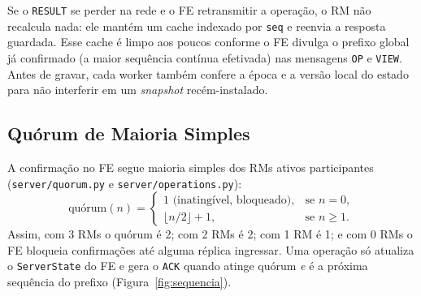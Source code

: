 \documentclass[12pt]{article}
\begin{document}
Se o \texttt{RESULT} se perder na rede e o FE retransmitir a operação, o RM não recalcula nada: ele mantém um cache indexado por \texttt{seq} e reenvia a resposta guardada. Esse cache é limpo aos poucos conforme o FE divulga o prefixo global já confirmado (a maior sequência contínua efetivada) nas mensagens \texttt{OP} e \texttt{VIEW}. Antes de gravar, cada worker também confere a época e a versão local do estado para não interferir em um \textit{snapshot} recém-instalado.

\subsection{Quórum de Maioria Simples}

A confirmação no FE segue maioria simples dos RMs ativos participantes (\texttt{server/quorum.py} e \texttt{server/operations.py}):
\[
    \text{quórum}(n) =
    \begin{cases}
        1 \text{ (inatingível, bloqueado)}, & \text{se } n = 0,\\
        \lfloor n / 2 \rfloor + 1, & \text{se } n \ge 1.
    \end{cases}
\]
Assim, com 3 RMs o quórum é 2; com 2 RMs é 2; com 1 RM é 1; e com 0 RMs o FE bloqueia confirmações até alguma réplica ingressar. Uma operação só atualiza o \texttt{ServerState} do FE e gera o \texttt{ACK} quando atinge quórum \emph{e} é a próxima sequência do prefixo (Figura~\ref{fig:sequencia}).
\end{document}
